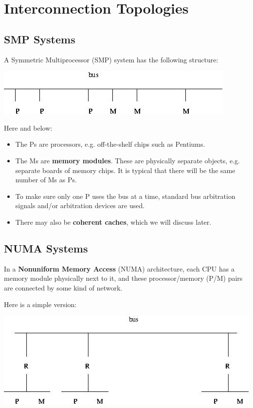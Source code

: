 \section{Interconnection Topologies}

\subsection{SMP Systems}

A Symmetric Multiprocessor (SMP) system has the following structure:

\includegraphics{Images/UMABus.jpg} 

Here and below:

\begin{itemize}

\item The Ps are processors, e.g. off-the-shelf chips such as Pentiums.

\item The Ms are \textbf{memory modules}. These are physically separate
objects, e.g. separate boards of memory chips.  It is typical that there
will be the same number of Ms as Ps. 

\item To make sure only one P uses the bus at a time, standard bus
arbitration signals and/or arbitration devices are used. 

\item There may also be \textbf{coherent caches}, which we will discuss later. 

\end{itemize}

\subsection{NUMA Systems}

In a {\bf Nonuniform Memory Access} (NUMA) architecture, each CPU has a
memory module physically next to it, and these processor/memory (P/M)
pairs are connected by some kind of network.

Here is a simple version:

\includegraphics{Images/NUMABus.jpg} 

